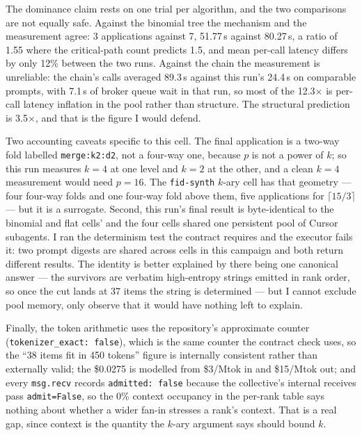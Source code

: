 \documentclass[11pt]{article}
\begin{document}
The dominance claim rests on one trial per algorithm, and the two comparisons are not
equally safe. Against the binomial tree the mechanism and the measurement agree: 3
applications against 7, 51.77\,s against 80.27\,s, a ratio of 1.55 where the
critical-path count predicts 1.5, and mean per-call latency differs by only 12\% between
the two runs. Against the chain the measurement is unreliable: the chain's calls averaged
89.3\,s against this run's 24.4\,s on comparable prompts, with 7.1\,s of broker queue wait
in that run, so most of the 12.3$\times$ is per-call latency inflation in the pool rather
than structure. The structural prediction is 3.5$\times$, and that is the figure I would
defend.

Two accounting caveats specific to this cell. The final application is a two-way fold
labelled \texttt{merge:k2:d2}, not a four-way one, because $p$ is not a power of $k$; so
this run measures $k=4$ at one level and $k=2$ at the other, and a clean $k=4$ measurement
would need $p=16$. The \texttt{fid-synth} $k$-ary cell has that geometry --- four four-way
folds and one four-way fold above them, five applications for $\lceil 15/3\rceil$ --- but
it is a surrogate. Second, this run's final result is byte-identical to the binomial and
flat cells' and the four cells shared one persistent pool of Cursor subagents. I ran the
determinism test the contract requires and the executor fails it: two prompt digests are
shared across cells in this campaign and both return different results. The identity is
better explained by there being one canonical answer --- the survivors are verbatim
high-entropy strings emitted in rank order, so once the cut lands at 37 items the string is
determined --- but I cannot exclude pool memory, only observe that it would have nothing
left to explain.

Finally, the token arithmetic uses the repository's approximate counter
(\texttt{tokenizer\_exact: false}), which is the same counter the contract check uses, so
the ``38 items fit in 450 tokens'' figure is internally consistent rather than externally
valid; the \$0.0275 is modelled from \$3/Mtok in and \$15/Mtok out; and every
\texttt{msg.recv} records \texttt{admitted: false} because the collective's internal
receives pass \texttt{admit=False}, so the 0\% context occupancy in the per-rank table says
nothing about whether a wider fan-in stresses a rank's context. That is a real gap, since
context is the quantity the $k$-ary argument says should bound $k$.
\end{document}
